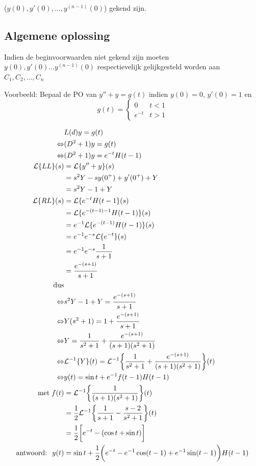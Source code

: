 \documentclass[12pt]{report}
\newcommand{\example}[2]{
    \hrulefill
    
    Voorbeeld: #1
    
    #2
    
    \hrulefill
}
\begin{document}
($y(0), y'(0),...,y^{(n-1)}(0)$) gekend zijn.
\subsection{Algemene oplossing}
Indien de beginvoorwaarden niet gekend zijn moeten $y(0),y'(0)...y^{(n-1)}(0)$ respectievelijk gelijkgesteld worden aan $C_1, C_2, ..., C_n$

\example{
  Bepaal de PO van $y'' + y = g(t)$ indien $y(0) = 0$, $y'(0) = 1$ en 
  $$
    g(t) = \begin{cases}
	      0 & t < 1 \\
	      e^{-t} & t > 1
	   \end{cases}
  $$
}{
  \begin{equation*}
   \begin{split}
                   & L(d)y = g(t) \\
   \Leftrightarrow & (D^2 + 1)y = g(t) \\
   \Leftrightarrow & (D^2 + 1)y = e^{-t}H(t - 1) \\
   \mathcal{L}\{LL\}(s) & = \mathcal{L}\{y'' + y\}(s) \\
                        & = s^2Y - sy(0^{+}) + y'(0^{+}) + Y \\
                        & = s^2Y - 1 + Y \\
   \mathcal{L}\{RL\}(s) & = \mathcal{L}\{e^{-t}H(t - 1\}(s) \\
                        & = \mathcal{L}\{e^{-(t - 1) - 1}H(t - 1)\}(s) \\
                        & = e^{-1}\mathcal{L}\{e^{-(t - 1)}H(t - 1)\}(s) \\
                        & = e^{-1}e^{-s}\mathcal{L}\{e^{-t}\}(s) \\
                        & = e^{-1}e^{-s}\frac{1}{s + 1} \\
                        & = \frac{e^{-(s + 1)}}{s + 1} \\
   \hbox{dus} \\
   \Leftrightarrow & s^2Y - 1 + Y = \frac{e^{-(s + 1)}}{s + 1} \\
   \Leftrightarrow & Y(s^2 + 1) = 1 + \frac{e^{-(s + 1)}}{s+1} \\
   \Leftrightarrow & Y = \frac{1}{s^2 + 1} + \frac{e^{-(s+1)}}{(s+1)(s^2+1)}     \\
   \Leftrightarrow & \mathcal{L}^{-1}\{Y\}(t) = \mathcal{L}^{-1}\bigg\{\frac{1}{s^2 + 1} + \frac{e^{-(s+1)}}{(s+1)(s^2+1)}\bigg\}(t) \\
   \Leftrightarrow & y(t) = \sin t +e^{-1}f(t - 1)H(t - 1) \\
	   \hbox{met}\; f(t) & = \mathcal{L}^{-1}\bigg\{\frac{1}{(s + 1)(s^2 + 1)}\bigg\}(t) \\
			     & = \frac{1}{2}\mathcal{L}^{-1}\bigg\{\frac{1}{s + 1} - \frac{s - 2}{s^2 + 1}\bigg\}(t) \\
			     & = \frac{1}{2}\bigg[e^{-t} - (\cos t + \sin t)\bigg] \\
	    \hbox{antwoord: }\; y(t)  & = \sin t + \frac{1}{2}\bigg(e^{-t} - e^{-1}\cos (t - 1) + e^{-1} \sin (t - 1) \bigg)H(t - 1)
   \end{split}
  \end{equation*}

}
\end{document}
